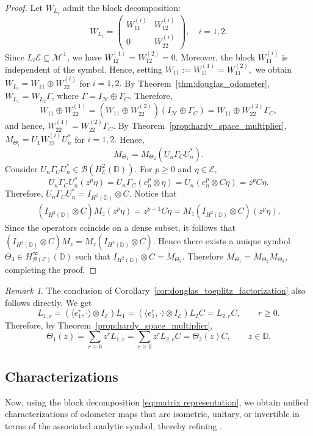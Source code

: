 \documentclass[12pt]{amsart}
\theoremstyle{definition}
\theoremstyle{remark}
\newtheorem{remark}[theorem]{Remark}
\def \D{\mathbb{D}}
\newcommand{\clb}{\mathcal{B}}
\newcommand{\cle}{\mathcal{E}}
\newcommand{\clm}{\mathcal{M}}
\newcommand{\cln}{\mathcal{N}}
\numberwithin{equation}{section}
\begin{document}
\begin{proof}
Let $W_{L_i}$ admit the block decomposition:
\[
W_{L_i} =
\begin{pmatrix}
W^{(i)}_{11} & W^{(i)}_{12} \\
0 & W^{(i)}_{22}
\end{pmatrix}, \quad i = 1,2.
\]
Since $L_i\cle \subseteq \clm^\perp$, we have $W_{12}^{(1)}=W_{12}^{(2)}=0$. Moreover, the block $W_{11}^{(i)}$ is independent of the symbol. Hence, setting $W_{11}:=W_{11}^{(1)}=W_{11}^{(2)},$ we obtain $W_{L_i}=W_{11}\oplus W_{22}^{(i)}$ for $i=1,2.$
By Theorem~\ref{thm:douglas_odometer}, $W_{L_1}=W_{L_2}\Gamma$, where $\Gamma=I_{\cln}\oplus \Gamma_C$. Therefore, 
\[
W_{11}\oplus W_{22}^{(1)}
=
(W_{11}\oplus W_{22}^{(2)})(I_{\cln}\oplus\Gamma_C)
=
W_{11}\oplus W_{22}^{(2)}\Gamma_C,
\]
and hence, $W_{22}^{(1)}=W_{22}^{(2)}\Gamma_C.$
By Theorem~\ref{prop:hardy_space_multiplier}, $M_{\Theta_i}=U_1W_{22}^{(i)}U_n^*$ for $i=1,2.$
Hence, 
\[
M_{\Theta_1} = M_{\Theta_2}(U_n\Gamma_CU_n^*).
\]
Consider $U_n \Gamma_C U_n^* \in \clb(H^2_\cle(\D))$. For $p\ge 0$ and $\eta \in \cle$, 
\[
U_n \Gamma_C U_n^*(z^p \eta) 
= U_n \Gamma_C (e_n^{p} \otimes \eta) 
= U_n (e_n^{p} \otimes C\eta) 
= z^p C\eta.
\]
Therefore, $U_n \Gamma_C U_n^* = I_{H^2(\D)} \otimes C$. Notice that
\begin{align*}
(I_{H^2(\D)} \otimes C) M_z (z^p \eta) = z^{p+1} C\eta=
M_z (I_{H^2(\D)} \otimes C)(z^p \eta).
\end{align*}
Since the operators coincide on a dense subset, it follows that $(I_{H^2(\D)} \otimes C) M_z = M_z (I_{H^2(\D)} \otimes C)$. Hence there exists a unique symbol $\Theta_3 \in H^\infty_{\clb(\cle)}(\D)$ such that $I_{H^2(\D)} \otimes C = M_{\Theta_3}$. Therefore $M_{\Theta_1} = M_{\Theta_2} M_{\Theta_3},$
completing the proof.
\end{proof}

\begin{remark}
The conclusion of Corollary~\ref{cor:douglas_toeplitz_factorization} 
also follows directly.
We get
\[
L_{1,r}
=
(\langle e_1^r,\cdot\rangle\otimes I_\cle)L_1
=
(\langle e_1^r,\cdot\rangle\otimes I_\cle)L_2C
=
L_{2,r}C,
\qquad r\geq0.
\]
Therefore, by Theorem~\ref{prop:hardy_space_multiplier},
\[
\Theta_1(z)
=
\sum_{r\geq0}z^rL_{1,r}
=
\sum_{r\geq0}z^rL_{2,r}C
=
\Theta_2(z)C,
\qquad z\in\D.
\]
\end{remark}

\subsection{Characterizations} \label{sec:Characterizations}
Now, using the block decomposition \eqref{eq:matrix representation}, we obtain unified characterizations of odometer maps that are isometric,
unitary, or invertible in terms of the associated analytic symbol,
thereby refining \cite[Theorem~3.1]{mansi2025}. 
\end{document}
